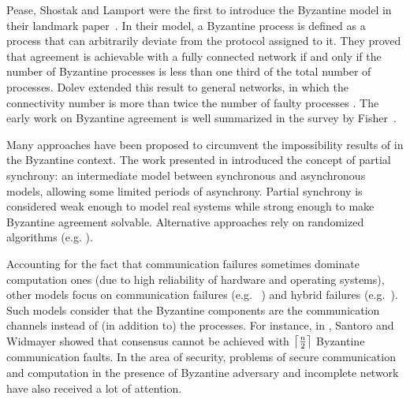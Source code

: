 \documentclass[11pt,letterpaper]{article}
\DeclarePairedDelimiter\ceil{\lceil}{\rceil}
\begin{document}
Pease, Shostak and Lamport were the first to introduce
the Byzantine model in their landmark
paper~\cite{lamport1982byzantine,pease1980reaching}.
In their model, a Byzantine process is defined as a process that can
arbitrarily deviate from the protocol assigned to it.
They proved that  agreement is achievable
with a fully connected network if and only if the number of Byzantine
processes is less than one third of the total number of
processes. Dolev extended this
result to general networks, in which the connectivity number is more than twice
the number of faulty processes \cite{dolev1982byzantine}.
The early work on Byzantine agreement
is well summarized in the survey by Fisher~{\cite{fischer1983consensus}}.

Many approaches have been proposed to circumvent the impossibility results of
\cite{fischer1985impossibility} in the Byzantine context.
The work presented in \cite{dwork1988consensus} introduced the concept
of partial synchrony: an intermediate model between
synchronous and asynchronous models, allowing some
limited periods of asynchrony. Partial synchrony is considered weak enough to model  real systems
while  strong enough to make Byzantine agreement solvable.
Alternative approaches rely on randomized algorithms (e.g.
{\cite{braud2013fast,dwork1988fault,king2011load,rabin1983randomized}}).

Accounting for the fact that communication failures sometimes dominate
computation ones (due to high reliability of hardware and operating systems), other models
focus on communication failures (e.g.
~{\cite{perry1986distributed,schmid2002formally}}) and hybrid failures
(e.g.~{\cite{gong1998byzantine,lincoln1993formally}}). Such models
consider that the Byzantine components are the communication channels instead of 
(in addition to) the processes.
For instance, in \cite{santoro1989time,santoro2007agreement}, Santoro and Widmayer
showed that consensus cannot be achieved with $\ceil*{\frac{n}{2}}$
Byzantine communication faults. 
In the area of security, problems of secure communication and computation in the presence of Byzantine adversary and incomplete network \cite{dolev1982byzantine,franklin1998secure} have also received a lot of attention.
%
\end{document}
